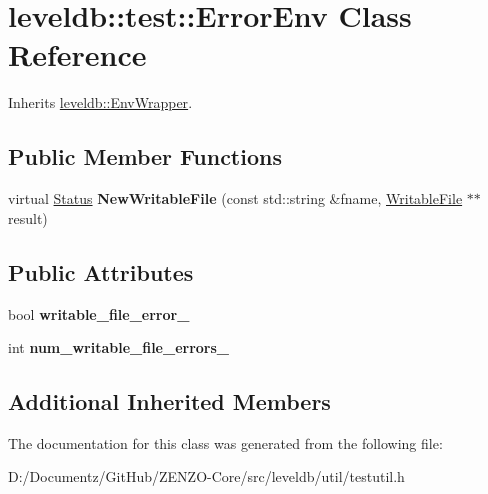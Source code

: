 \hypertarget{classleveldb_1_1test_1_1_error_env}{}\section{leveldb\+::test\+::Error\+Env Class Reference}
\label{classleveldb_1_1test_1_1_error_env}


Inherits \mbox{\hyperlink{classleveldb_1_1_env_wrapper}{leveldb\+::\+Env\+Wrapper}}.

\subsection*{Public Member Functions}
\begin{DoxyCompactItemize}
\item 
\mbox{\label{classleveldb_1_1test_1_1_error_env_a2990be71c7fb9473bd1fa0f8da8fd078}} 
virtual \mbox{\hyperlink{classleveldb_1_1_status}{Status}} {\bfseries New\+Writable\+File} (const std\+::string \&fname, \mbox{\hyperlink{classleveldb_1_1_writable_file}{Writable\+File}} $\ast$$\ast$result)
\end{DoxyCompactItemize}
\subsection*{Public Attributes}
\begin{DoxyCompactItemize}
\item 
\mbox{\label{classleveldb_1_1test_1_1_error_env_ae3593b752dff671f24f3637376e1cf22}} 
bool {\bfseries writable\+\_\+file\+\_\+error\+\_\+}
\item 
\mbox{\label{classleveldb_1_1test_1_1_error_env_afa4564355d86107c8ed0d6efe53eadef}} 
int {\bfseries num\+\_\+writable\+\_\+file\+\_\+errors\+\_\+}
\end{DoxyCompactItemize}
\subsection*{Additional Inherited Members}


The documentation for this class was generated from the following file\+:\begin{DoxyCompactItemize}
\item 
D\+:/\+Documentz/\+Git\+Hub/\+Z\+E\+N\+Z\+O-\/\+Core/src/leveldb/util/testutil.\+h\end{DoxyCompactItemize}
